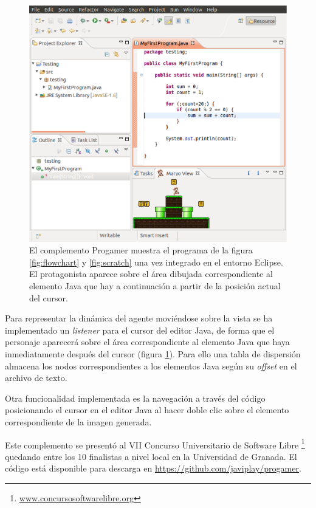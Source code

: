\documentclass{llncs}
\begin{document}
\begin{figure}[ht]
\begin{center}
\includegraphics[scale=0.5]{images/eclipse.eps}
\caption{El complemento Progamer muestra el programa de la figura \ref{fig:flowchart} y \ref{fig:scratch} una vez integrado en el entorno Eclipse. El protagonista aparece sobre el área dibujada correspondiente al elemento Java que hay a continuación a partir de la posición actual del cursor.
\label{fig:eclipse}}
\end{center}
\end{figure}

Para representar la dinámica del agente moviéndose sobre la vista se ha
implementado un {\em listener} para el cursor del editor Java, de forma que el personaje aparecerá sobre el área correspondiente al elemento Java que haya inmediatamente después del cursor (figura \ref{fig:eclipse}). Para ello una tabla de dispersión almacena los nodos correspondientes a los elementos Java según su {\em offset} en el archivo de texto.

Otra funcionalidad implementada es la navegación a través del código posicionando el cursor en el editor Java al hacer doble clic sobre el elemento correspondiente de la imagen generada.

Este complemento se presentó al VII Concurso Universitario de Software Libre \footnote{\url{www.concursosoftwarelibre.org}} quedando entre los 10 finalistas a nivel local en la Universidad de Granada. El código está disponible para descarga en \url{https://github.com/javiplay/progamer}.
\end{document}
